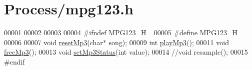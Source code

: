 \hypertarget{mpg123_8h_source}{\section{\-Process/mpg123.h}
}

\begin{DoxyCode}
00001 
00002 
00003 
00004 \textcolor{preprocessor}{#ifndef MPG123\_H\_}
00005 \textcolor{preprocessor}{}\textcolor{preprocessor}{#define MPG123\_H\_}
00006 \textcolor{preprocessor}{}
00007 \textcolor{keywordtype}{void} \hyperlink{mpg123_8c_a644a4493a8aeafe0544786ffb8b2a96a}{resetMp3}(\textcolor{keywordtype}{char}* song);
00009 \textcolor{keywordtype}{int} \hyperlink{mpg123_8c_a548762aaed08753cbed2cfabe0a5202b}{playMp3}();
00011 \textcolor{keywordtype}{void} \hyperlink{mpg123_8c_ad8bff7d817bc1b5f8c1ab8388158bc29}{freeMp3}();
00013 \textcolor{keywordtype}{void} \hyperlink{mpg123_8c_a852896f3beba9503ee018f0a1bdf28ea}{setMp3Status}(\textcolor{keywordtype}{int} value);
00014 \textcolor{comment}{//void resample();}
00015 \textcolor{preprocessor}{#endif}
\end{DoxyCode}
